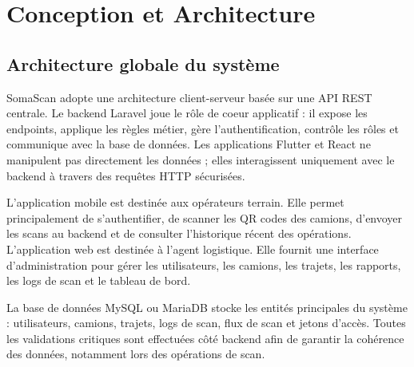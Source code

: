 \chapter{Conception et Architecture}



\section{Architecture globale du système}

SomaScan adopte une architecture client-serveur basée sur une API REST centrale. Le backend Laravel joue le rôle de coeur applicatif : il expose les endpoints, applique les règles métier, gère l'authentification, contrôle les rôles et communique avec la base de données. Les applications Flutter et React ne manipulent pas directement les données ; elles interagissent uniquement avec le backend à travers des requêtes HTTP sécurisées.

L'application mobile est destinée aux opérateurs terrain. Elle permet principalement de s'authentifier, de scanner les QR codes des camions, d'envoyer les scans au backend et de consulter l'historique récent des opérations. L'application web est destinée à l'agent logistique. Elle fournit une interface d'administration pour gérer les utilisateurs, les camions, les trajets, les rapports, les logs de scan et le tableau de bord.

La base de données MySQL ou MariaDB stocke les entités principales du système : utilisateurs, camions, trajets, logs de scan, flux de scan et jetons d'accès. Toutes les validations critiques sont effectuées côté backend afin de garantir la cohérence des données, notamment lors des opérations de scan.


